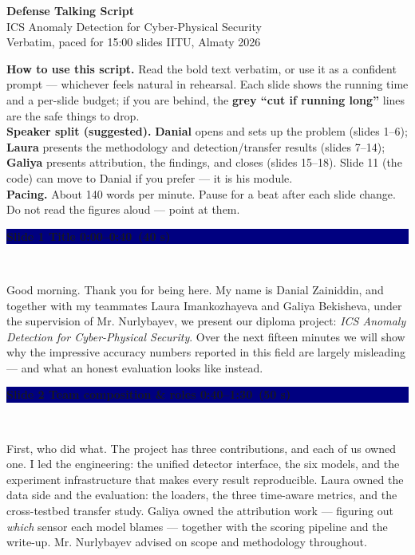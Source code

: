 \documentclass[11pt,a4paper]{article}
\newcommand{\spk}[1]{{\color{teal}\bfseries #1}}
\newcommand{\slide}[5]{%
  \medskip
  \noindent\colorbox{navy}{\parbox{\dimexpr\textwidth-2\fboxsep}{%
    \color{white}\bfseries Slide #1 \;\textbar\; #2
    \hfill {\normalfont\color{lightbg}\small #4 \,(#5)}}}\\[2pt]
  \noindent{\color{teal}\small\textbf{Speaker: #3}}\par\vspace{2pt}%
}
\begin{document}
\begin{center}
{\LARGE\bfseries\color{navy} Defense Talking Script}\\[4pt]
{\large ICS Anomaly Detection for Cyber-Physical Security}\\[6pt]
{\color{muted} Verbatim, paced for 15:00 \;\textbar{} slides \;\textbar\; IITU, Almaty 2026}
\end{center}

\vspace{4pt}
\begin{tcolorbox}[colback=lightbg,colframe=teal,boxrule=0.8pt,arc=2pt]
\textbf{How to use this script.} Read the bold text verbatim, or use it as a confident prompt --- whichever feels natural in rehearsal. Each slide shows the running time and a per-slide budget; if you are behind, the \textbf{\color{muted}grey ``cut if running long''} lines are the safe things to drop. \\[4pt]
\textbf{Speaker split (suggested).} \spk{Danial} opens and sets up the problem (slides 1--6); \spk{Laura} presents the methodology and detection/transfer results (slides 7--14); \spk{Galiya} presents attribution, the findings, and closes (slides 15--18). Slide 11 (the code) can move to Danial if you prefer --- it is his module. \\[4pt]
\textbf{Pacing.} About 140 words per minute. Pause for a beat after each slide change. Do not read the figures aloud --- point at them.
\end{tcolorbox}

\slide{1}{Title}{Danial}{0:00--0:40}{40 s}
Good morning. Thank you for being here. My name is Danial Zainiddin, and together with my teammates Laura Imankozhayeva and Galiya Bekisheva, under the supervision of Mr. Nurlybayev, we present our diploma project: \textit{ICS Anomaly Detection for Cyber-Physical Security}. Over the next fifteen minutes we will show why the impressive accuracy numbers reported in this field are largely misleading --- and what an honest evaluation looks like instead.

\slide{2}{Team composition \& roles}{Danial}{0:40--1:30}{50 s}
First, who did what. The project has three contributions, and each of us owned one. I led the engineering: the unified detector interface, the six models, and the experiment infrastructure that makes every result reproducible. Laura owned the data side and the evaluation: the loaders, the three time-aware metrics, and the cross-testbed transfer study. Galiya owned the attribution work --- figuring out \textit{which} sensor each model blames --- together with the scoring pipeline and the write-up. Mr. Nurlybayev advised on scope and methodology throughout.
\end{document}
